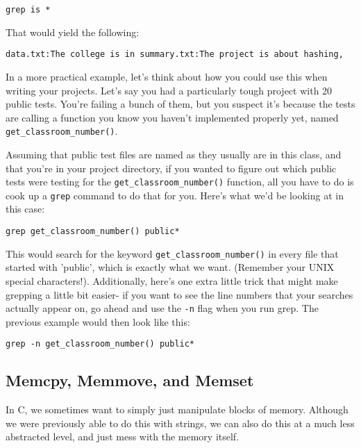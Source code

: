 \documentclass[english, 10pt]{article}
\begin{document}
\texttt{grep is *}\newline

That would yield the following:\newline

\texttt{data.txt:The college is in\newline
summary.txt:The project is about hashing,
}\newline

In a more practical example, let's think about how you could use this when writing your projects. Let's say you had a particularly tough project with 20 public tests. You're failing a bunch of them, but you suspect it's because the tests are calling a function you know you haven't implemented properly yet, named \texttt{get\_classroom\_number()}.\newline

Assuming that public test files are named as they usually are in this class, and that you're in your project directory, if you wanted to figure out which public tests were testing for the \texttt{get\_classroom\_number()} function, all you have to do is cook up a \texttt{grep} command to do that for you. Here's what we'd be looking at in this case:\newline

\texttt{grep get\_classroom\_number() public*}\newline

This would search for the keyword \texttt{get\_classroom\_number()} in every file that started with 'public', which is exactly what we want. (Remember your UNIX special characters!). Additionally, here's one extra little trick that might make grepping a little bit easier- if you want to see the line numbers that your searches actually appear on, go ahead and use the \texttt{-n} flag when you run grep. The previous example would then look like this:\newline

\texttt{grep -n get\_classroom\_number() public*}

\subsection{Memcpy, Memmove, and Memset}

In C, we sometimes want to simply just manipulate blocks of memory. Although we were previously able to do this with strings, we can also do this at a much less abstracted level, and just mess with the memory itself.\newline
\end{document}
